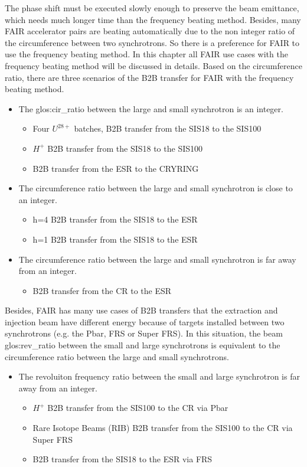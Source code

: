 The phase shift must be executed slowly enough to preserve the beam emittance, which needs much longer time than the frequency beating method. Besides, many FAIR accelerator pairs are beating automatically due to the non integer ratio of the circumference between two synchrotrons. So there is a preference for FAIR to use the frequency beating method. In this chapter all FAIR use cases with the frequency beating method will be discussed in details. Based on the circumference ratio, there are three scenarios of the B2B transfer for FAIR with the frequency beating method. 
\begin{itemize}
	\item The \gls{glos:cir_ratio} between the large and small synchrotron is an integer.
		\begin{itemize}
			\item	Four $U^{28+}$ batches,  B2B transfer from the SIS18 to the SIS100
			\item $H^{+}$ B2B transfer from the SIS18 to the SIS100
			\item B2B transfer from the ESR to the CRYRING
		\end{itemize}
	\item The circumference ratio between the large and small synchrotron is close to an integer.
		\begin{itemize}
			\item h=4 B2B transfer from the SIS18 to the ESR
			\item h=1 B2B transfer from the SIS18 to the ESR
		\end{itemize}
 	\item The circumference ratio between the large and small synchrotron is far away from an integer.
		\begin{itemize}
			\item B2B transfer from the CR to the ESR
		\end{itemize}
\end{itemize}
Besides, FAIR has many use cases of B2B transfers that the extraction and injection beam have different energy because of targets installed between two synchrotrons (e.g. the Pbar, FRS or Super FRS). In this situation, the beam \gls{glos:rev_ratio} between the small and large synchrotrons is equivalent to the circumference ratio between the large and small synchrotrons. 

\begin{itemize}

 	\item The revoluiton frequency ratio between the small and large synchrotron is far away from an integer.
		\begin{itemize}
			\item $H^{+}$ B2B transfer from the SIS100 to the CR via Pbar
			\item Rare Isotope Beams (\gls{RIB}) B2B transfer from the SIS100 to the CR via Super FRS
			\item B2B transfer from the SIS18 to the ESR via FRS
		\end{itemize}
\end{itemize}
  
